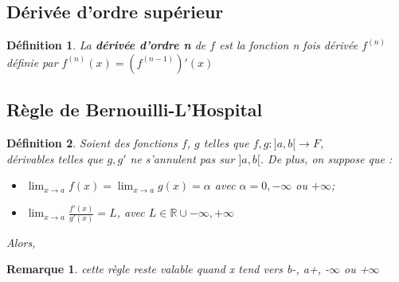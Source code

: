 \documentclass[12pt, a4paper]{book}
\newtheorem*{definition}{Définition}
\newtheorem*{remarque}{Remarque}
\begin{document}
\subsection{Dérivée d'ordre supérieur}
\begin{definition}
    La \textbf{dérivée d'ordre n} de $f$ est la fonction n fois dérivée $f^{(n)}$ définie par $f^{(n)}(x) = (f^{(n-1)})'(x)$ 
\end{definition}
\subsection{Règle de Bernouilli-L'Hospital}
\begin{definition}
    Soient des fonctions $f$, $g$ telles que $f, g : ]a,b[ \rightarrow F$, \\
    dérivables telles que $g, g'$ ne s'annulent pas sur $]a,b[$. De plus, on suppose que :
    \begin{itemize}
        \item  $\lim_{x \to a} f(x) = \lim_{x \to a} g(x) = \alpha$ avec $\alpha= 0, - \infty$ ou $+\infty$;
        \item $\lim_{x \to a} \frac{f'(x)}{g'(x)} = L$, avec $L \in \mathbb{R} \cup {-\infty, +\infty}$
    \end{itemize}
Alors,
\begin{center}
\end{center}
\end{definition}
\begin{remarque}
    cette règle reste valable quand x tend vers b-, a+, -$\infty$ ou +$\infty$
\end{remarque}
\end{document}
